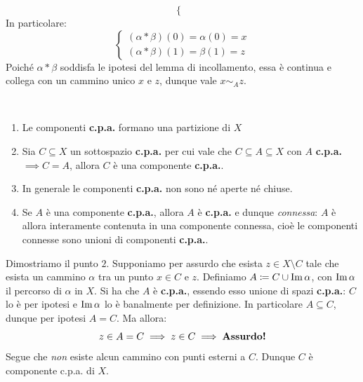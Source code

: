\begin{demonstration}
\begin{itemize}
\begin{equation}
\begin{cases}
	\end{cases}
\end{equation}
In particolare:
\begin{equation*}
	\begin{cases}
	\left(\alpha\ast\beta\right)\left(0\right)=\alpha\left(0\right)=x\\
	\left(\alpha\ast\beta\right)\left(1\right)=\beta\left(1\right)=z
		\end{cases}
\end{equation*}
Poiché $\alpha\ast\beta$ soddisfa le ipotesi del lemma di incollamento, essa è continua e collega con un cammino unico $x$ e $z$, dunque vale $x\sim_A z$.
	\end{itemize}
\end{demonstration}
\begin{observes}~{}
	\begin{enumerate}
		\item Le componenti \textbf{c.p.a.} formano una partizione di $X$
		\item Sia $C\subseteq X$ un sottospazio \textbf{c.p.a.} per cui vale che $C\subseteq A\subseteq X$ con $A$ \textbf{c.p.a.}$\implies C=A$, allora $C$ è una componente \textbf{c.p.a.}.
		\item In generale le componenti \textbf{c.p.a.} non sono né aperte né chiuse.
		\item Se $A$ è una componente \textbf{c.p.a.}, allora $A$ è \textbf{c.p.a.} e dunque \textit{connessa}: $A$ è allora interamente contenuta in una componente connessa, cioè le componenti connesse sono unioni di componenti \textbf{c.p.a.}.
	\end{enumerate}
\vspace{-3mm}
\end{observes}
\begin{demonstration}
	Dimostriamo il punto $2$. Supponiamo per assurdo che esista $z\in X\setminus C$ tale che esista un cammino $\alpha$ tra un punto $x\in C$ e $z$. Definiamo $A\coloneqq C\cup \operatorname{Im} \alpha$, con $\operatorname{Im} \alpha$ il percorso di $\alpha$ in $X$. Si ha che $A$ è \textbf{c.p.a.}, essendo esso unione di spazi \textbf{c.p.a.}: $C$ lo è per ipotesi e $\operatorname{Im} \alpha$ lo è banalmente per definizione. In particolare $A\subseteq C$, dunque per ipotesi $A=C$. Ma allora:
	\begin{equation*}
		z\in A=C\implies z\in C\implies\text{\textbf{Assurdo!}}
	\end{equation*}
	Segue che \textit{non} esiste alcun cammino con punti esterni a $C$. Dunque $C$ è componente c.p.a. di $X$.
\end{demonstration}
